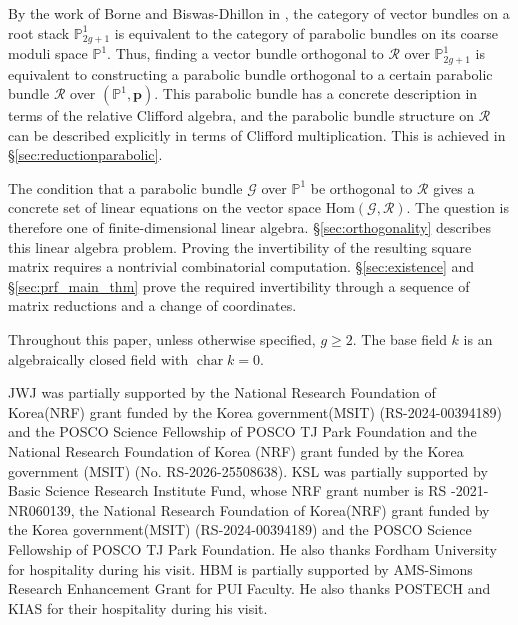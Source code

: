\documentclass[12pt, letterpaper]{amsart}
\theoremstyle{definition}
\newcommand{\PP}{\mathbb{P} }
\newcommand{\cG}{\mathcal{G} }
\newcommand{\cR}{\mathcal{R} }
\newcommand{\bp}{\mathbf{p} }
\def\rHom{\mathrm{Hom} }
\begin{document}
By the work of Borne and Biswas-Dhillon in \cite{Bor07, BD11}, the category of vector bundles on a root stack \(\PP_{2g+1}^1\) is equivalent to the category of parabolic bundles on its coarse moduli space \(\PP^1\). Thus, finding a vector bundle orthogonal to \(\cR\) over \(\PP_{2g+1}^1\) is equivalent to constructing a parabolic bundle orthogonal to a certain parabolic bundle \(\cR\) over \((\PP^1, \bp)\). This parabolic bundle has a concrete description in terms of the relative Clifford algebra, and the parabolic bundle structure on \(\cR\) can be described explicitly in terms of Clifford multiplication. This is achieved in \S\ref{sec:reductionparabolic}.

The condition that a parabolic bundle \(\cG\) over \(\PP^1\) be orthogonal to \(\cR\) gives a concrete set of linear equations on the vector space \(\rHom(\cG, \cR)\). The question is therefore one of finite-dimensional linear algebra. \S\ref{sec:orthogonality} describes this linear algebra problem. Proving the invertibility of the resulting square matrix requires a nontrivial combinatorial computation. \S\ref{sec:existence} and \S\ref{sec:prf_main_thm} prove the required invertibility through a sequence of matrix reductions and a change of coordinates.

Throughout this paper, unless otherwise specified, \(g \ge 2\). The base field \(k\) is an algebraically closed field with \(\operatorname{char} k=0\).

\acknowledgement

JWJ was partially supported by the National Research Foundation of Korea(NRF) grant funded by the Korea government(MSIT) (RS-2024-00394189) and the POSCO Science Fellowship of POSCO TJ Park Foundation and the National Research Foundation of Korea (NRF) grant funded by the Korea government (MSIT) (No. RS-2026-25508638). KSL was partially supported by Basic Science Research Institute Fund, whose NRF grant number is RS -2021-NR060139, the National Research Foundation of Korea(NRF) grant funded by the Korea government(MSIT) (RS-2024-00394189) and the POSCO Science Fellowship of POSCO TJ Park Foundation. He also thanks Fordham University for hospitality during his visit. HBM is partially supported by AMS-Simons Research Enhancement Grant for PUI Faculty. He also thanks POSTECH and KIAS for their hospitality during his visit.
\end{document}
